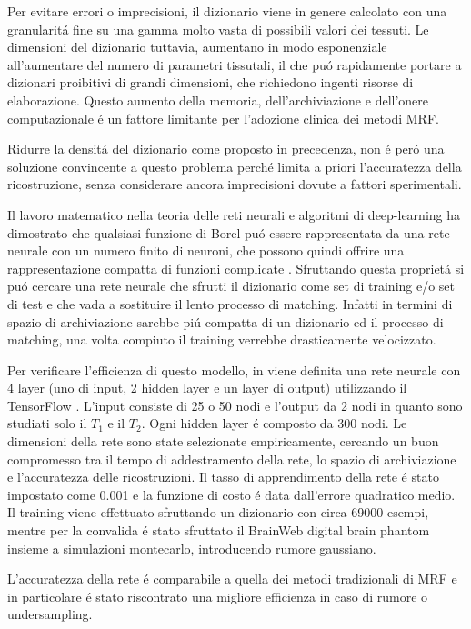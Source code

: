 \documentclass[a4paper,12pt]{report}
\begin{document}
 Per evitare errori o imprecisioni, il dizionario viene in genere calcolato con una granularit\'a fine su una gamma molto vasta di possibili valori dei tessuti. 
 Le dimensioni del dizionario tuttavia, aumentano in modo esponenziale all'aumentare del numero di parametri tissutali, il che pu\'o rapidamente portare a dizionari proibitivi di grandi dimensioni, che richiedono ingenti risorse di elaborazione. 
 Questo aumento della memoria, dell'archiviazione e dell'onere computazionale \'e un fattore limitante per l'adozione clinica dei metodi MRF. 
 
 Ridurre la densit\'a del dizionario come proposto in precedenza, non \'e per\'o una soluzione convincente a questo problema perch\'e limita a priori l'accuratezza della ricostruzione, senza considerare ancora imprecisioni dovute a fattori sperimentali. 
 
 Il lavoro matematico nella teoria delle reti neurali e algoritmi di deep-learning ha dimostrato che qualsiasi funzione di Borel pu\'o essere rappresentata da una rete neurale con un numero finito di neuroni, che possono quindi offrire una rappresentazione compatta di funzioni complicate \cite{hornik1989multilayer}. 
 Sfruttando questa propriet\'a si pu\'o cercare una rete neurale che sfrutti il dizionario come set di training e/o set di test e che vada a sostituire il lento processo di matching. 
 Infatti in termini di spazio di archiviazione sarebbe pi\'u compatta di un dizionario ed il processo di matching, una volta compiuto il training verrebbe drasticamente velocizzato.
 
 Per verificare l'efficienza di questo modello, in \cite{cohen2018mr} viene definita una rete neurale con 4 layer (uno di input, 2 hidden layer e un layer di output) utilizzando il TensorFlow \cite{abadi2016tensorflow}. 
 L'input consiste di 25 o 50 nodi e l'output da 2 nodi in quanto sono studiati solo il $T_1$ e il $T_2$. 
 Ogni hidden layer \'e composto da 300 nodi. 
 Le dimensioni della rete sono state selezionate empiricamente, cercando un buon compromesso tra il tempo di addestramento della rete, lo spazio di archiviazione e l'accuratezza delle ricostruzioni. 
 Il tasso di apprendimento della rete \'e stato impostato come 0.001 e la funzione di costo \'e data dall'errore quadratico medio. 
 Il training viene effettuato sfruttando un dizionario con circa 69000 esempi, mentre per la convalida \'e stato sfruttato il BrainWeb digital brain phantom insieme a simulazioni montecarlo, introducendo rumore  gaussiano. 
 
 L'accuratezza della rete \'e comparabile a quella dei metodi tradizionali di MRF e in particolare \'e stato riscontrato una migliore efficienza in caso di rumore o undersampling.
 
\end{document}
